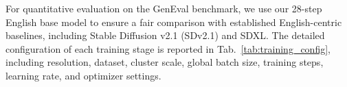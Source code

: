 For quantitative evaluation on the GenEval benchmark, we use our 28-step English base model to ensure a fair comparison with established English-centric baselines, including Stable Diffusion v2.1 (SDv2.1) and SDXL. The detailed configuration of each training stage is reported in Tab.~\ref{tab:training_config}, including resolution, dataset, cluster scale, global batch size, training steps, learning rate, and optimizer settings.


